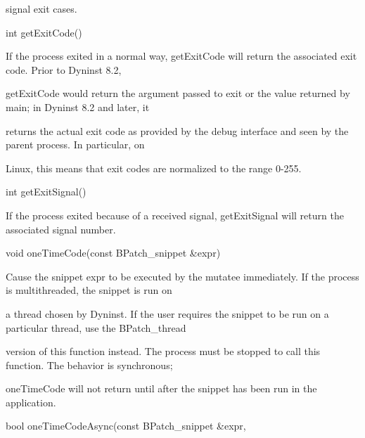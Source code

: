 {{{{{{{{{signal exit cases.}



{

int getExitCode()}



{

If the process exited in a normal way, getExitCode will return the associated exit code. Prior to Dyninst 8.2,

getExitCode would return the argument passed to exit or the value returned by main; in Dyninst 8.2 and later, it

returns the actual exit code as provided by the debug interface and seen by the parent process. In particular, on

Linux, this means that exit codes are normalized to the range 0-255.}



{

int getExitSignal()}



{

If the process exited because of a received signal, getExitSignal will return the associated signal number.}





\bigskip



{

void oneTimeCode(const BPatch_snippet &expr)



{

Cause the snippet expr to be executed by the mutatee immediately. If the process is multithreaded, the snippet is run on

a thread chosen by Dyninst. If the user requires the snippet to be run on a particular thread, use the BPatch_thread

version of this function instead. The process must be stopped to call this function. The behavior is synchronous;

oneTimeCode will not return until after the snippet has been run in the application.}





\bigskip



{

bool oneTimeCodeAsync(const BPatch_snippet &expr,



}}}}}}}}}}
